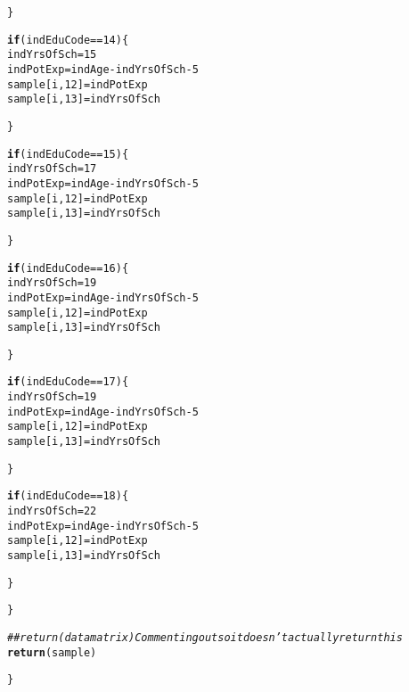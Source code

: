 \documentclass{article}\usepackage[]{graphicx}\usepackage[]{color}
\makeatletter
\newcommand{\hlnum}[1]{\textcolor[rgb]{0.686,0.059,0.569}{#1}}%
\newcommand{\hlcom}[1]{\textcolor[rgb]{0.678,0.584,0.686}{\textit{#1}}}%
\newcommand{\hlopt}[1]{\textcolor[rgb]{0,0,0}{#1}}%
\newcommand{\hlstd}[1]{\textcolor[rgb]{0.345,0.345,0.345}{#1}}%
\newcommand{\hlkwa}[1]{\textcolor[rgb]{0.161,0.373,0.58}{\textbf{#1}}}%
\newcommand{\hlkwb}[1]{\textcolor[rgb]{0.69,0.353,0.396}{#1}}%
\newcommand{\hlkwd}[1]{\textcolor[rgb]{0.737,0.353,0.396}{\textbf{#1}}}%
\newenvironment{kframe}{%
 \def\at@end@of@kframe{}%
 \ifinner\ifhmode%
  \def\at@end@of@kframe{\end{minipage}}%
  \begin{minipage}{\columnwidth}%
 \fi\fi%
 \def\FrameCommand##1{\hskip\@totalleftmargin \hskip-\fboxsep
 \colorbox{shadecolor}{##1}\hskip-\fboxsep
     \hskip-\linewidth \hskip-\@totalleftmargin \hskip\columnwidth}%
 \MakeFramed {\advance\hsize-\width
   \@totalleftmargin\z@ \linewidth\hsize
   \@setminipage}}%
 {\par\unskip\endMakeFramed%
 \at@end@of@kframe}
\newenvironment{knitrout}{}{} %
\makeatother
\begin{document}
\begin{knitrout}
\begin{kframe}
\begin{alltt}
    \hlstd{\}}

    \hlkwa{if} \hlstd{(indEduCode} \hlopt{==} \hlnum{14}\hlstd{)\{}
      \hlstd{indYrsOfSch} \hlkwb{=} \hlnum{15}
      \hlstd{indPotExp} \hlkwb{=} \hlstd{indAge} \hlopt{-} \hlstd{indYrsOfSch} \hlopt{-} \hlnum{5}
      \hlstd{sample[i,}\hlnum{12}\hlstd{]} \hlkwb{=} \hlstd{indPotExp}
      \hlstd{sample[i,}\hlnum{13}\hlstd{]} \hlkwb{=} \hlstd{indYrsOfSch}

    \hlstd{\}}

    \hlkwa{if} \hlstd{(indEduCode} \hlopt{==} \hlnum{15}\hlstd{)\{}
      \hlstd{indYrsOfSch} \hlkwb{=} \hlnum{17}
      \hlstd{indPotExp} \hlkwb{=} \hlstd{indAge} \hlopt{-} \hlstd{indYrsOfSch} \hlopt{-} \hlnum{5}
      \hlstd{sample[i,}\hlnum{12}\hlstd{]} \hlkwb{=} \hlstd{indPotExp}
      \hlstd{sample[i,}\hlnum{13}\hlstd{]} \hlkwb{=} \hlstd{indYrsOfSch}

    \hlstd{\}}

    \hlkwa{if} \hlstd{(indEduCode} \hlopt{==} \hlnum{16}\hlstd{)\{}
      \hlstd{indYrsOfSch} \hlkwb{=} \hlnum{19}
      \hlstd{indPotExp} \hlkwb{=} \hlstd{indAge} \hlopt{-} \hlstd{indYrsOfSch} \hlopt{-} \hlnum{5}
      \hlstd{sample[i,}\hlnum{12}\hlstd{]} \hlkwb{=} \hlstd{indPotExp}
      \hlstd{sample[i,}\hlnum{13}\hlstd{]} \hlkwb{=} \hlstd{indYrsOfSch}

    \hlstd{\}}

    \hlkwa{if} \hlstd{(indEduCode} \hlopt{==} \hlnum{17}\hlstd{)\{}
      \hlstd{indYrsOfSch} \hlkwb{=} \hlnum{19}
      \hlstd{indPotExp} \hlkwb{=} \hlstd{indAge} \hlopt{-} \hlstd{indYrsOfSch} \hlopt{-} \hlnum{5}
      \hlstd{sample[i,}\hlnum{12}\hlstd{]} \hlkwb{=} \hlstd{indPotExp}
      \hlstd{sample[i,}\hlnum{13}\hlstd{]} \hlkwb{=} \hlstd{indYrsOfSch}

    \hlstd{\}}

    \hlkwa{if} \hlstd{(indEduCode} \hlopt{==} \hlnum{18}\hlstd{)\{}
      \hlstd{indYrsOfSch} \hlkwb{=} \hlnum{22}
      \hlstd{indPotExp} \hlkwb{=} \hlstd{indAge} \hlopt{-} \hlstd{indYrsOfSch} \hlopt{-} \hlnum{5}
      \hlstd{sample[i,}\hlnum{12}\hlstd{]} \hlkwb{=} \hlstd{indPotExp}
      \hlstd{sample[i,}\hlnum{13}\hlstd{]} \hlkwb{=} \hlstd{indYrsOfSch}

    \hlstd{\}}

  \hlstd{\}}

  \hlcom{## return(datamatrix) Commenting out so it doesn't actually return this}
  \hlkwd{return}\hlstd{(sample)}

\hlstd{\}}


\end{alltt}
\end{kframe}
\end{knitrout}
\end{document}

